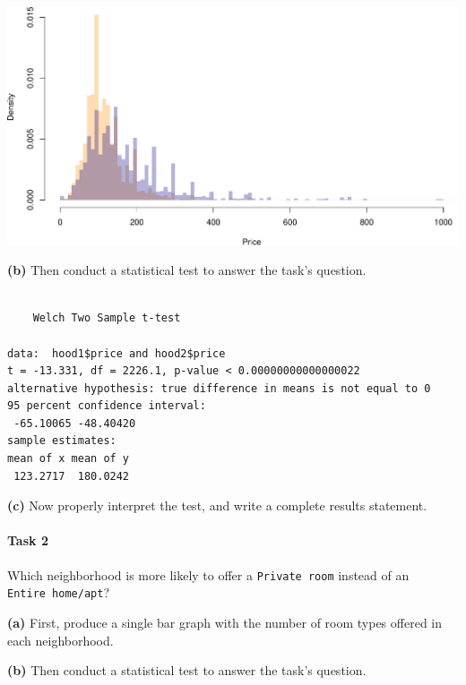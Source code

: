 \documentclass[
]{book}
\newenvironment{Shaded}{\begin{snugshade}}{\end{snugshade}}
\newcommand{\KeywordTok}[1]{\textcolor[rgb]{0.13,0.29,0.53}{\textbf{#1}}}
\newcommand{\NormalTok}[1]{#1}
\newcommand{\OperatorTok}[1]{\textcolor[rgb]{0.81,0.36,0.00}{\textbf{#1}}}
\begin{document}
\includegraphics{figures/unnamed-chunk-246-1.pdf}

\textbf{(b)} Then conduct a statistical test to answer the task's question.

\begin{Shaded}
\end{Shaded}

\begin{verbatim}

    Welch Two Sample t-test

data:  hood1$price and hood2$price
t = -13.331, df = 2226.1, p-value < 0.00000000000000022
alternative hypothesis: true difference in means is not equal to 0
95 percent confidence interval:
 -65.10065 -48.40420
sample estimates:
mean of x mean of y 
 123.2717  180.0242 
\end{verbatim}

\textbf{(c)} Now properly interpret the test, and write a complete results statement.

\hypertarget{task-2-1}{%
\paragraph{Task 2}\label{task-2-1}}

Which neighborhood is more likely to offer a \texttt{Private\ room} instead of an \texttt{Entire\ home/apt}?

\textbf{(a)} First, produce a single bar graph with the number of room types offered in each neighborhood.

\textbf{(b)} Then conduct a statistical test to answer the task's question.
\end{document}
